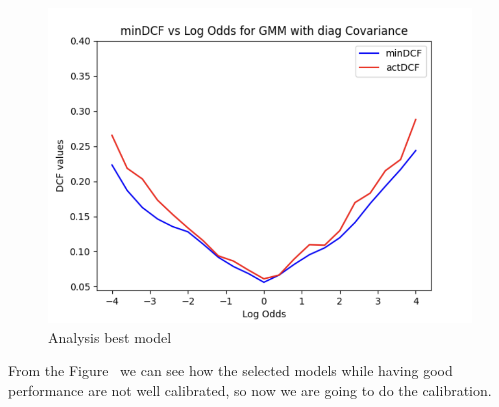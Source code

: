 \documentclass{article}
\begin{document}
\begin{figure}[H]
\begin{minipage}{.3\textwidth}
    \end{minipage}
    \begin{minipage}{.3\textwidth}
        \centering
        \includegraphics[width=\linewidth]{./img/BestGMM.png}
    \end{minipage}
    \caption{Analysis best model} %
    \label{fig:CalAnal} %
\end{figure}
From the Figure~ we can see how the selected models while having good performance are not well calibrated, so now we are going to do the calibration.
\end{document}
